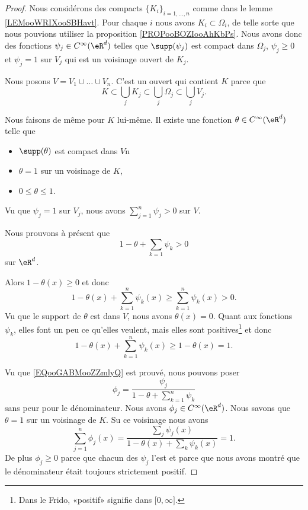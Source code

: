 \begin{proof}
	Nous considérons des compacts \( \{ K_i \}_{i=1,\ldots, n}\) comme dans le lemme \ref{LEMooWRIXooSBHavt}. Pour chaque \( i\) nous avons \( K_i\subset \Omega_i\), de telle sorte que nous pouvions utiliser la proposition \ref{PROPooBOZIooAhKbPs}. Nous avons donc des fonctions \( \psi_j\in  C^{\infty}(\eR^d)\) telles que \( \supp(\psi_j)\) est compact dans \( \Omega_j\), \( \psi_j\geq 0\) et \( \psi_j=1\) sur \( V_j\) qui est un voisinage ouvert de \( K_j\).

	Nous posons \( V=V_1\cup\ldots \cup V_n\). C'est un ouvert qui contient \( K\) parce que
	\begin{equation}
		K\subset \bigcup_jK_j\subset\bigcup_j\Omega_j\subset \bigcup_jV_j.
	\end{equation}

	Nous faisons de même pour \( K\) lui-même. Il existe une fonction \( \theta\in  C^{\infty}(\eR^d)\) telle que
	\begin{itemize}
		\item \( \supp(\theta)\) est compact dans \( V\)n
		\item
		      \( \theta=1\) sur un voisinage de \( K\),
		\item
		      \( 0\leq \theta\leq 1\).
	\end{itemize}
	Vu que \( \psi_j=1\) sur \( V_j\), nous avons \( \sum_{j=1}^n\psi_j>0\) sur \( V\).

	Nous prouvons à présent que
	\begin{equation}        \label{EQooGABMooZZmlyQ}
		1-\theta+\sum_{k=1}\psi_k>0
	\end{equation}
	sur \( \eR^d\).
	\begin{subproof}
		\spitem[Si \( x\in V\)]
		Alors \( 1-\theta(x)\geq 0\) et donc
		\begin{equation}
			1-\theta(x)+\sum_{k=1}^n\psi_k(x)\geq \sum_{k=1}^n\psi_k(x)>0.
		\end{equation}
		\spitem[Si \( x\notin V\)]
		Vu que le support de \( \theta\) est dans \( V\), nous avons \( \theta(x)=0\). Quant aux fonctions \( \psi_k\), elles font un peu ce qu'elles veulent, mais elles sont positives\footnote{Dans le Frido, «positif» signifie dans \( \mathopen[ 0 , \infty \mathclose]\).} et donc
		\begin{equation}
			1-\theta(x)+\sum_{k=1}^n\psi_k(x)\geq 1-\theta(x)=1.
		\end{equation}
	\end{subproof}
	Vu que \eqref{EQooGABMooZZmlyQ} est prouvé, nous pouvons poser
	\begin{equation}
		\phi_j=\frac{ \psi_j }{ 1-\theta+\sum_{k=1}^n\psi_k }
	\end{equation}
	sans peur pour le dénominateur. Nous avons \( \phi_j\in  C^{\infty}(\eR^d)\). Nous savons que \( \theta=1\) sur un voisinage de \( K\). Su ce voisinage nous avons
	\begin{equation}
		\sum_{j=1}^n\phi_j(x)=\frac{ \sum_{j}\psi_j(x) }{ 1-\theta(x)+\sum_k\psi_k(x) }=1.
	\end{equation}
	De plus \( \phi_j\geq 0\) parce que chacun des \( \psi_j\) l'est et parce que nous avons montré que le dénominateur était toujours strictement positif.


\end{proof}
